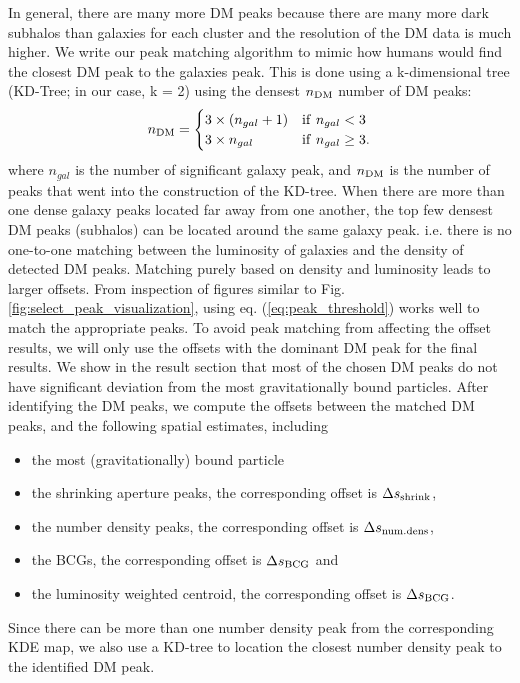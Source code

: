 In general, there are many more DM peaks because there are many more dark 
subhalos than galaxies for each cluster and the resolution of the DM data is
much higher. We write our peak matching algorithm to mimic how humans would
find the closest DM peak to the galaxies peak. 
This is done using a k-dimensional tree (KD-Tree; in our case, k = 2) 
using the densest $n_{\rm DM}$ number of DM peaks:
\begin{equation}
	n_{\rm DM} = \begin{cases}		
		3 \times (n_{gal} + 1) & {\rm if~} n_{gal} < 3 \\
	3 \times n_{gal}  & {\rm if~} n_{gal} \geq 3.
	\end{cases}
	\label{eq:peak_threshold}
\end{equation}
where $n_{gal}$ is the number of significant galaxy peak, and $n_{\rm DM}$
is the number of peaks that went into the construction of the KD-tree.
When there are more
than one dense galaxy peaks located far away from one another, 
the top few densest DM peaks (subhalos) can be located around the same galaxy peak.
i.e. there is no one-to-one matching between the luminosity of galaxies and the
density of detected DM peaks.
Matching purely based on density and luminosity leads to larger offsets.
From inspection of figures similar to Fig. \ref{fig:select_peak_visualization}, using eq. (\ref{eq:peak_threshold}) works well to match the 
appropriate peaks. 
To avoid peak matching from affecting the offset results,
we will only use the offsets with the dominant DM peak for the final results.
We show in the result section that most of the chosen DM peaks
do not have significant deviation from the most gravitationally bound particles.
After identifying the DM peaks, we compute the 
offsets between the matched DM peaks, and the following spatial estimates, including 
\begin{itemize}
	\item the most (gravitationally) bound particle 
	\item the shrinking aperture peaks, the corresponding offset is $\Delta s_{\rm
		shrink}$, 
	\item the number density peaks, the corresponding offset is $\Delta s_{\rm
		num.dens}$, 
	\item the BCGs, the corresponding offset is $\Delta s_{\rm BCG}$ and
\item the luminosity weighted centroid, the corresponding offset is $\Delta s_{\rm BCG}$.
\end{itemize}
Since there can be more than one number density peak from the corresponding KDE
map, we also use a KD-tree to location the closest number density peak to the 
identified DM peak.

